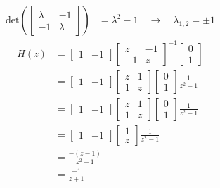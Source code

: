 \documentclass[twoside]{article}
\begin{document}
\begin{align*}
\mathrm{det} \left( \left[ \begin{array}{cc} \lambda & -1 \\ -1 &
                                                                  \lambda \end{array}
                                                                  \right]
                                                                  \right)
                                                                  &=
                                                                  \lambda^2
                                                                  - 1
\quad \rightarrow \quad \lambda_{1,2} = \pm 1
\end{align*}
%
\begin{align*}
  H(z) &= \left[ \begin{array}{cc} 1 & -1 \end{array} \right]
\left[ \begin{array}{cc} z & -1 \\ -1 & z\end{array}
                                                                  \right]^{-1}
\left[ \begin{array}{c} 0 \\ 1 \end{array} \right]
\\
&=
\left[ \begin{array}{cc} 1 & -1 \end{array} \right]
\left[ \begin{array}{cc} z & 1 \\ 1 & z\end{array}
                                                                  \right]
\left[ \begin{array}{c} 0 \\ 1 \end{array} \right] \frac{1}{z^2 - 1}
\\
&=
\left[ \begin{array}{cc} 1 & -1 \end{array} \right]
\left[ \begin{array}{cc} z & 1 \\ 1 & z\end{array}
                                                                  \right]
\left[ \begin{array}{c} 0 \\ 1 \end{array} \right] \frac{1}{z^2 - 1}
\\
&=
\left[ \begin{array}{cc} 1 & -1 \end{array} \right]
\left[ \begin{array}{c} 1 \\ z \end{array} \right] \frac{1}{z^2 - 1}
\\
&= \frac{-(z-1)}{z^2 - 1} 
\\
&= \frac{-1}{z + 1} 
\end{align*}
\end{document}
